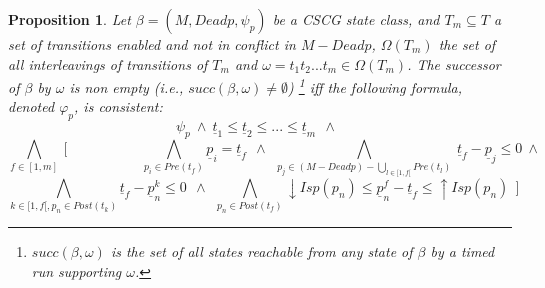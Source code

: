 \documentclass[submission,copyright,creativecommons]{eptcs}
\newtheorem{proposition}{Proposition}
\numberwithin{equation}{section}
\begin{document}
\begin{proposition} \label{prop}
Let $\beta = (M, Deadp, \psi_p)$ be a CSCG state class, and $T_m \subseteq T$ a set of transitions enabled and not in conflict in $M-Deadp$, $\Omega(T_m)$ the set of all interleavings of transitions of $T_m$ and $\omega=t_1t_2...t_m \in \Omega(T_m)$.
The successor of $\beta$ by $\omega$ is non empty (i.e., $succ(\beta,\omega)\neq \emptyset$) \footnote{$succ(\beta,\omega)$ is the set of all states reachable from any state of $\beta$ by a timed run supporting $\omega$.} iff the following formula, denoted $\varphi_p$, is consistent:
$$\psi_p \ \wedge \  \underline{t}_1 \leq \underline{t}_2 \leq ... \leq \underline{t}_m \ \ \wedge \ \ $$ $$ \underset{f \in [1,m]} \bigwedge \ [ \ \ \ \ \ \ \ \ \ \ \ \ \ \ \ \ \ \ \ \ \ \ \ \  \underset{p_i \in Pre(t_{f})} \bigwedge  \underline{p}_i = \underline{t}_f \ \ \wedge \ \ \underset{p_j \in (M-Deadp) - \underset{l \in [1,f[} \bigcup Pre(t_{l})} \bigwedge   \  \underline{t}_{f} - \underline{p}_{j} \leq 0  \  \wedge  \  $$
$$ \underset{ k \in[1,f[, p_n \in Post(t_{k})} \bigwedge \underline{t}_{f} - \underline{p}_{n}^k \leq 0
 \ \ \wedge \ \ \underset{p_n \in Post(t_{f})} \bigwedge {\downarrow Isp(p_{n})} \leq \underline{p}_{n}^f - \underline{t}_{f} \leq
{\uparrow Isp(p_{n})} \ \ ]$$
\end{proposition}
\end{document}
